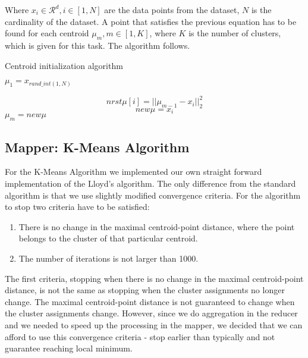 \documentclass[a4paper, 11pt]{article}
\begin{document}
Where $x_i \in \mathcal{R}^d, i \in [1,N]$ are the data points from the dataset, $N$ is the cardinality of the dataset. A point that satisfies the previous equation has to be found for each centroid $\mu_m, m \in [1,K]$, where $K$ is the number of clusters, which is given for this task. The algorithm follows.
\begin{algorithm}{}\label{alg:init}
\caption{Centroid initialization algorithm}
\begin{algorithmic}[1]

\State $\mu_1 = x_{rand\_int(1,N)}$

                        $$nrst\mu[i] = ||\mu_{m-1}-x_i||_2^2$$
                \EndIf
                        $$new\mu = x_i$$
                \EndIf
        \EndFor
        \State $\mu_m = new\mu$
\EndFor
\end{algorithmic}
\end{algorithm}
\subsection{Mapper: K-Means Algorithm}
For the K-Means Algorithm we implemented our own straight forward implementation of the Lloyd's algorithm. The only difference from the standard algorithm is that we use slightly modified convergence criteria. For the algorithm to stop two criteria have to be satisfied: 
\begin{enumerate}
\item There is no change in the maximal centroid-point distance, where the point belongs to the cluster of that particular centroid.
\item The number of iterations is not larger than 1000. 
\end{enumerate}

The first criteria, stopping when there is no change in the maximal centroid-point distance, is not the same as stopping when the cluster assignments no longer change. The maximal centroid-point distance is not guaranteed to change when the cluster assignments change. However, since we do aggregation in the reducer and we needed to speed up the processing in the mapper, we decided that we can afford to use this convergence criteria - stop earlier than typically and not guarantee reaching local minimum.
\end{document}
